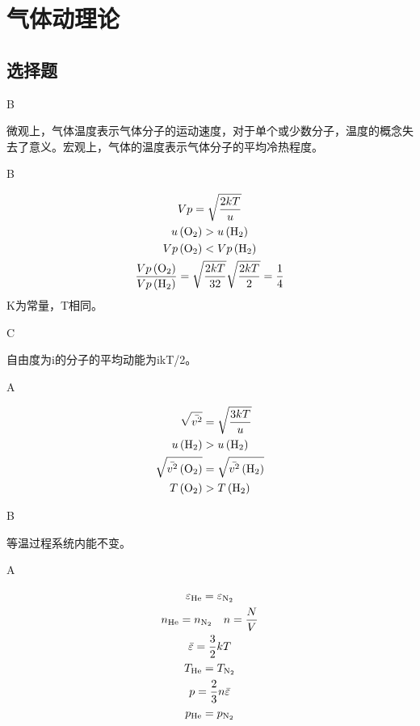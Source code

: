 \chapter{气体动理论}
\section{选择题}
\exercise B

\solve 微观上，气体温度表示气体分子的运动速度，对于单个或少数分子，温度的概念失去了意义。宏观上，气体的温度表示气体分子的平均冷热程度。

\exercise B

\solve
\begin{gather*} 
{Vp=\sqrt{\frac{2kT}{u}}}\\
{u\left(\ce{O2}\right)}>u\left(\ce{H2}\right)\\
{Vp\left(\ce{O2}\right)<Vp\left(\ce{H2}\right) } \\
\frac{Vp\left(\ce{O2}\right)}{Vp\left(\ce{H2}\right)}=\sqrt{\frac{2kT}{32}} \sqrt{\frac{2kT}{2}}=\frac{1}{4}%
\end{gather*}
K为常量，T相同。

\exercise C

\solve 自由度为i的分子的平均动能为ikT/2。

\exercise A

\solve

$$
\begin{aligned} \sqrt {\bar{v^{2}}} &=\sqrt{\frac{3kT}{u}} \\
u\left(\ce{H2}\right)& > u\left(\ce{H2}\right) \\
\sqrt {\bar{v^{2}}\left(\ce{O2}\right)}& = \sqrt {\bar{v^{2}}\left(\ce{H2}\right) }\\
T\left(\ce{O2}\right)&>T\left(\ce{H2}\right) 
\end{aligned}
$$

\exercise B

\solve 等温过程系统内能不变。

\exercise A

\solve

\begin{gather*}
\varepsilon_{\ce{He}}=\varepsilon_{\ce{N2}}\\
n_{\ce{He}}=n_{\ce{N2}}\quad n=\frac{N}{V}\\
\bar{\varepsilon}=\frac{3}{2}kT\\
T_{\ce{He}}=T_{\ce{N2}}\\
p=\frac{2}{3}n\bar{\varepsilon}\\
p_{\ce{He}}=p_{\ce{N2}}
\end{gather*}

